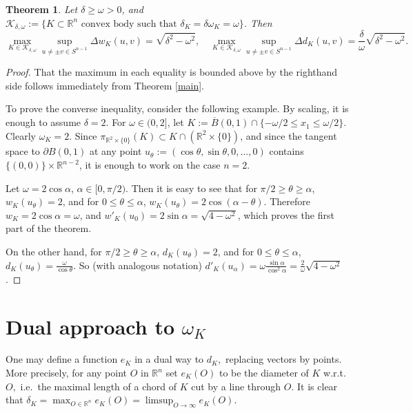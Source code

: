 \documentclass[a4paper,12pt]{amsart}
\newtheorem{thm}{Theorem}
\def\ds{\displaystyle}
\def\R{\mathbb R}
\def\om{\omega}
\def\d{\delta}
\begin{document}
\begin{thm}
Let $\delta\ge \omega >0$, and $\mathcal K_{\delta,\omega}:= \{
K\subset \R^n \mbox{ convex body such that } \delta_K=\delta
\omega_K=\omega\}$. Then
\[
\max_{K \in \mathcal K_{\delta,\omega} } \sup_{u\neq \pm v \in S^{n-1} }
\Delta w_K(u,v)= \sqrt{\d^2-\om^2} ,
\quad
\max_{K \in \mathcal K_{\delta,\omega} } \sup_{u\neq \pm v \in S^{n-1} }
\Delta d_K(u,v)= \frac\delta\omega \sqrt{\d^2-\om^2} .
\]
\end{thm}

\begin{proof}
That the maximum in each equality is bounded above by the righthand side follows
immediately from Theorem \ref{main}.

To prove the converse inequality, consider the following example.
By scaling, it is enough to assume $\delta=2$. For $\omega\in
(0,2]$, let $K:= \overline B(0,1) \cap \{-\omega/2 \le x_1 \le
\omega/2\}$. Clearly $\omega_K=2$. Since $\pi_{\R^2\times\{0\}}
(K)\subset  K \cap (\R^2\times\{0\})$, and since the tangent space
to $\partial B(0,1)$ at any point $u_\theta:= (\cos \theta, \sin
\theta, 0, \dots, 0)$ contains $\{(0,0)\}\times\R^{n-2}$, it is
enough to work on the case $n=2$.

Let $\omega=2\cos \alpha$, $\alpha \in [0, \pi/2)$. Then it is
easy to see that for $\pi/2 \ge \theta\ge \alpha$,
$w_K(u_\theta)=2$, and for $0\le \theta\le \alpha$,
$w_K(u_\theta)=2 \cos (\alpha - \theta)$. Therefore $w_K= 2\cos
\alpha=\omega$, and $w'_K(u_0)= 2 \sin \alpha =
\sqrt{4-\omega^2}$, which proves the first part of the theorem.

On the other hand, for $\pi/2 \ge \theta\ge \alpha$, $d_K(u_\theta)=2$,
and for $0\le \theta\le \alpha$, $d_K(u_\theta)=\frac{\omega}{\cos \theta}$.
So (with analogous notation) $d'_K(u_\alpha)= \omega\frac{\sin \alpha}{\cos^2 \alpha}=
\frac2\omega \sqrt{4-\omega^2}$.
\end{proof}





\section{Dual approach to $\om_K$}
\label{pole}

One may define a function $e_K$
in a dual way to $d_K,$ replacing vectors by points. More precisely, for any point $O$
in $\R^n$ set $e_K(O)$ to be the diameter of $K$ w.r.t.~$O,$ i.e.~the maximal length of
a chord of $K$ cut by a line through $O.$ It is clear that
$\d_K=\ds\max_{O\in \R^n} e_K(O)=\ds\limsup_{O\to\infty} e_K(O).$
\end{document}
